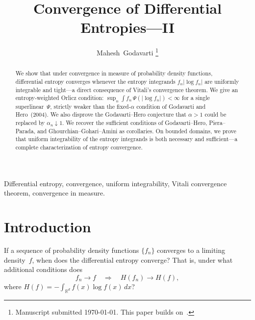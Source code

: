 \documentclass[journal]{IEEEtran}
\theoremstyle{definition}
\theoremstyle{remark}
\newcommand{\Rd}{\mathbb{R}^d}
\newcommand{\1}{\mathbf{1}}
\newcommand{\Hent}{H}
\newcommand{\abs}[1]{\lvert #1 \rvert}
\newcommand{\dx}{\,dx}
\begin{document}
\title{Convergence of Differential Entropies---{II}}

\author{Mahesh~Godavarti%
\thanks{Manuscript submitted \today.  This paper builds
on~\cite{GodavartiHero2004}.}}

\maketitle

\begin{abstract}
We show that under convergence in measure of probability density
functions, differential entropy converges whenever the entropy
integrands $f_n \abs{\log f_n}$ are uniformly integrable and
tight---a direct consequence of Vitali's convergence theorem.
We give an entropy-weighted Orlicz condition:
$\sup_n \int f_n\, \Psi(\abs{\log f_n}) < \infty$ for a single
superlinear~$\Psi$, strictly weaker than the fixed-$\alpha$
condition of Godavarti and Hero~(2004).  We also disprove the
Godavarti--Hero conjecture that $\alpha > 1$ could be replaced by
$\alpha_n \downarrow 1$.  We recover the sufficient conditions of
Godavarti--Hero, Piera--Parada, and Ghourchian--Gohari--Amini
as corollaries.  On bounded domains, we prove that uniform
integrability of the entropy integrands is both necessary and
sufficient---a complete characterization of entropy convergence.
\end{abstract}

\begin{IEEEkeywords}
Differential entropy, convergence, uniform integrability, Vitali
convergence theorem, convergence in measure.
\end{IEEEkeywords}

\section{Introduction}\label{sec:intro}

If a sequence of probability density functions $\{f_n\}$ converges to
a limiting density~$f$, when does the differential entropy converge?
That is, under what additional conditions does
\begin{equation}\label{eq:entropy-conv}
  f_n \to f
  \quad\Longrightarrow\quad
  \Hent(f_n) \to \Hent(f),
\end{equation}
where $\Hent(f) = -\int_{\Rd} f(x) \log f(x) \dx$?
\end{document}
